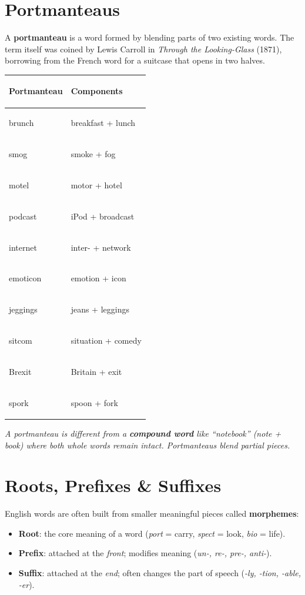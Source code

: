 \documentclass[11pt, letterpaper]{article}
\begin{document}
\section*{Portmanteaus}

A \textbf{portmanteau} is a word formed by blending parts of two existing words. The term itself
was coined by Lewis Carroll in \emph{Through the Looking-Glass} (1871), borrowing from
the French word for a suitcase that opens in two halves.

\noindent
{\renewcommand{\arraystretch}{1.5}
\begin{tabularx}{\textwidth}{>{\bfseries\raggedright\arraybackslash}p{3cm}
                              >{\raggedright\arraybackslash}X}
\toprule
\rowcolor{tableheadergreen}
\textbf{Portmanteau} & \textbf{Components} \\
\midrule
\rowcolor{rowA}  brunch       & breakfast + lunch \\
\rowcolor{rowBg} smog         & smoke + fog \\
\rowcolor{rowA}  motel        & motor + hotel \\
\rowcolor{rowBg} podcast      & iPod + broadcast \\
\rowcolor{rowA}  internet     & inter- + network \\
\rowcolor{rowBg} emoticon     & emotion + icon \\
\rowcolor{rowA}  jeggings     & jeans + leggings \\
\rowcolor{rowBg} sitcom       & situation + comedy \\
\rowcolor{rowA}  Brexit       & Britain + exit \\
\rowcolor{rowBg} spork        & spoon + fork \\
\bottomrule
\end{tabularx}}

\textit{A portmanteau is different from a \textbf{compound word} like ``notebook'' (note + book) where both whole words remain intact. Portmanteaus blend partial pieces.}

\section*{Roots, Prefixes \& Suffixes}

English words are often built from smaller meaningful pieces called \textbf{morphemes}:

\begin{itemize}[noitemsep]
  \item \textbf{Root}: the core meaning of a word (\emph{port} = carry, \emph{spect} = look, \emph{bio} = life).
  \item \textbf{Prefix}: attached at the \emph{front}; modifies meaning (\emph{un-, re-, pre-, anti-}).
  \item \textbf{Suffix}: attached at the \emph{end}; often changes the part of speech (\emph{-ly, -tion, -able, -er}).
\end{itemize}
\end{document}
